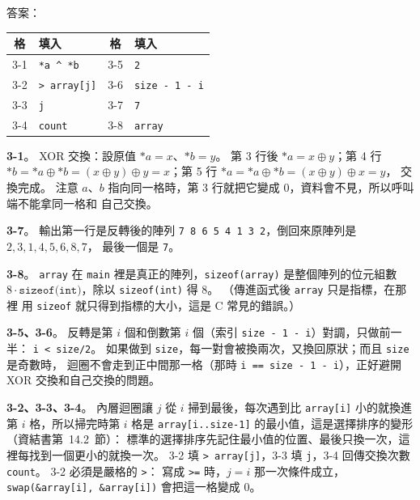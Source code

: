 \begin{pastsoln}
答案：
\begin{center}
\small
\begin{tabular}{cl|cl}
\toprule
格 & 填入 & 格 & 填入 \\
\midrule
3-1 & \texttt{*a \^{} *b} & 3-5 & \texttt{2} \\
3-2 & \texttt{> array[j]} & 3-6 & \texttt{size - 1 - i} \\
3-3 & \texttt{j} & 3-7 & \texttt{7} \\
3-4 & \texttt{count} & 3-8 & \texttt{array} \\
\bottomrule
\end{tabular}
\end{center}

\textbf{3-1}。 XOR 交換：設原值 $*a = x$、$*b = y$。 第 3 行後 $*a = x \oplus y$；第 4 行
$*b = *a \oplus *b = (x \oplus y) \oplus y = x$；第 5 行 $*a = *a \oplus *b = (x \oplus y) \oplus x = y$，
交換完成。 注意 $a$、$b$ 指向同一格時，第 3 行就把它變成 $0$，資料會不見，所以呼叫端不能拿同一格和
自己交換。

\textbf{3-7}。 輸出第一行是反轉後的陣列 \texttt{7 8 6 5 4 1 3 2}，倒回來原陣列是 $2, 3, 1, 4, 5, 6, 8, 7$，
最後一個是 \texttt{7}。

\textbf{3-8}。 \texttt{array} 在 \texttt{main} 裡是真正的陣列，\texttt{sizeof(array)} 是整個陣列的位元組數
$8 \cdot \texttt{sizeof(int)}$，除以 \texttt{sizeof(int)} 得 $8$。 （傳進函式後 \texttt{array} 只是指標，在那裡
用 \texttt{sizeof} 就只得到指標的大小，這是 C 常見的錯誤。）

\textbf{3-5、3-6}。 反轉是第 $i$ 個和倒數第 $i$ 個（索引 \texttt{size - 1 - i}）對調，只做前一半：
\texttt{i < size/2}。 如果做到 \texttt{size}，每一對會被換兩次，又換回原狀；而且 \texttt{size} 是奇數時，
迴圈不會走到正中間那一格（那時 \texttt{i == size - 1 - i}），正好避開 XOR 交換和自己交換的問題。

\textbf{3-2、3-3、3-4}。 內層迴圈讓 $j$ 從 $i$ 掃到最後，每次遇到比 \texttt{array[i]} 小的就換進第 $i$
格，所以掃完時第 $i$ 格是 \texttt{array[i..size-1]} 的最小值，這是選擇排序的變形（資結書第~14.2~節）：
標準的選擇排序先記住最小值的位置、最後只換一次，這裡每找到一個更小的就換一次。 3-2 填
\texttt{> array[j]}，3-3 填 \texttt{j}，3-4 回傳交換次數 \texttt{count}。 3-2 必須是嚴格的 \texttt{>}：
寫成 \texttt{>=} 時，$j = i$ 那一次條件成立，\texttt{swap(\&array[i], \&array[i])} 會把這一格變成 $0$。


\end{pastsoln}
